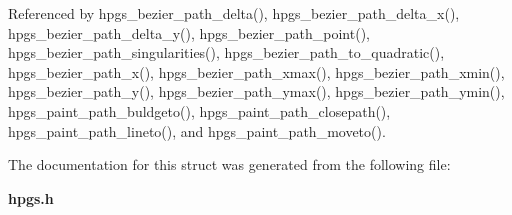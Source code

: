 Referenced by hpgs\_\-bezier\_\-path\_\-delta(), hpgs\_\-bezier\_\-path\_\-delta\_\-x(), hpgs\_\-bezier\_\-path\_\-delta\_\-y(), hpgs\_\-bezier\_\-path\_\-point(), hpgs\_\-bezier\_\-path\_\-singularities(), hpgs\_\-bezier\_\-path\_\-to\_\-quadratic(), hpgs\_\-bezier\_\-path\_\-x(), hpgs\_\-bezier\_\-path\_\-xmax(), hpgs\_\-bezier\_\-path\_\-xmin(), hpgs\_\-bezier\_\-path\_\-y(), hpgs\_\-bezier\_\-path\_\-ymax(), hpgs\_\-bezier\_\-path\_\-ymin(), hpgs\_\-paint\_\-path\_\-buldgeto(), hpgs\_\-paint\_\-path\_\-closepath(), hpgs\_\-paint\_\-path\_\-lineto(), and hpgs\_\-paint\_\-path\_\-moveto().



The documentation for this struct was generated from the following file:\begin{DoxyCompactItemize}
\item 
{\bf hpgs.h}\end{DoxyCompactItemize}
